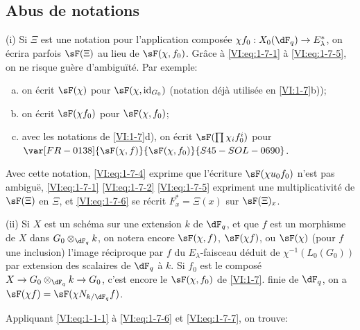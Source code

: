 \subsection{Abus de notations}\label{VI:1-8}

(i) Si $\Xi$ est une notation pour l'application composée 
$\chi f_0:X_0(\dF_q) \to E_\lambda^\ast$, on écrira parfois $\sF(\Xi)$ au 
lieu de $\sF(\chi,f_0)$. Grâce à \eqref{VI:eq:1-7-1} à \eqref{VI:eq:1-7-5}, 
on ne risque guère d'ambiguïté. Par exemple:
\begin{enumerate}[a)]
  \item on écrit $\sF(\chi)$ pour $\sF(\chi,\operatorname{id}_{G_0})$ 
    (notation déjà utilisée en \ref{VI:1-7}b)); 
  \item on écrit $\sF(\chi f_0)$ pour $\sF(\chi,f_0)$;
  \item avec les notations de \ref{VI:1-7}d), on écrit 
    $\sF(\prod \chi_i f_0^i)$ pour $\var[FR-0138]{\sF(\chi,f)}{\sF(\chi,f_0)}{S45-SOL-0690}$. 
\end{enumerate}

Avec cette notation, \eqref{VI:eq:1-7-4} exprime que l'écriture 
$\sF(\chi u_0 f_0)$ n'est pas ambiguë, \eqref{VI:eq:1-7-1} \eqref{VI:eq:1-7-2} 
\eqref{VI:eq:1-7-5} expriment une multiplicativité de $\sF(\Xi)$ en $\Xi$, 
et \eqref{VI:eq:1-7-6} se récrit $F_x^\ast = \Xi(x)$ sur $\sF(\Xi)_x$.

(ii) Si $X$ est un schéma sur une extension $k$ de $\dF_q$, et que $f$ est un 
morphisme de $X$ dans $G_0\otimes_{\dF_q} k$, on notera encore $\sF(\chi,f)$, 
$\sF(\chi f)$, ou $\sF(\chi)$ (pour $f$ une inclusion) l'image réciproque par 
$f$ du $E_\lambda$-faisceau déduit de $\chi^{-1}(L_0(G_0))$ par extension des 
scalaires de $\dF_q$ à $k$. Si $f_0$ est le composé 
$X\to G_0\otimes_{\dF_q} k \to G_0$, c'est encore le $\sF(\chi,f_0)$ de 
\ref{VI:1-7}.  finie de $\dF_q$, on a 
$\sF(\chi f) = \sF(\chi N_{k/\dF_q} f)$. 

Appliquant \eqref{VI:eq:1-1-1} à \eqref{VI:eq:1-7-6} et \eqref{VI:eq:1-7-7}, 
on trouve: 





